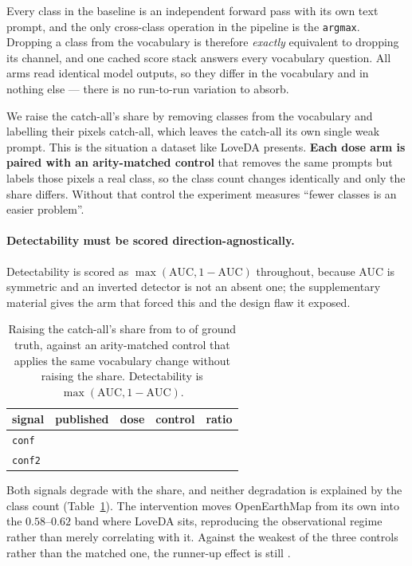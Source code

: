 \documentclass[10pt,a4paper]{article}                        %
\newcommand{\best}[1]{\textbf{#1}}
\newcommand{\suppref}[1]{the supplementary material}
\begin{document}
Every class in the baseline is an independent forward pass with its own text
prompt, and the only cross-class operation in the pipeline is the \texttt{argmax}.
Dropping a class from the vocabulary is therefore \emph{exactly} equivalent to
dropping its channel, and one cached score stack answers every vocabulary
question. All \ivArms{} arms read identical model outputs, so they differ in the
vocabulary and in nothing else --- there is no run-to-run variation to absorb.

We raise the catch-all's share by removing classes from the vocabulary and
labelling their pixels catch-all, which leaves the catch-all its own single weak
prompt. This is the situation a dataset like LoveDA presents. \best{Each dose arm
is paired with an arity-matched control} that removes the same prompts but labels
those pixels a real class, so the class count changes identically and only the
share differs. Without that control the experiment measures ``fewer classes is an
easier problem''.

\paragraph{Detectability must be scored direction-agnostically.} Detectability is scored as $\max(\mathrm{AUC}, 1-\mathrm{AUC})$ throughout, because AUC is symmetric and an inverted detector is not an absent one; \suppref{sup:auc} gives the arm that forced this and the design flaw it exposed.

\begin{table}[t]\centering\small
\caption{Raising the catch-all's share from \ivShareA{} to \ivShareD{} of ground
truth, against an arity-matched control that applies the same vocabulary change
without raising the share. Detectability is
$\max(\mathrm{AUC}, 1-\mathrm{AUC})$.}
\label{tab:intervention}
\begin{tabular}{lrrrr}
\toprule
signal & published & dose & control & ratio \\
\midrule
\texttt{conf}  & \ivA{}    & \best{\ivB{}}    & \ivD{}    & \ivRatio{} \\
\texttt{conf2} & \ivAtwo{} & \best{\ivBtwo{}} & \ivDtwo{} & \ivRatioTwo{} \\
\bottomrule
\end{tabular}
\end{table}

Both signals degrade with the share, and neither degradation is explained by the
class count (Table~\ref{tab:intervention}). The intervention moves OpenEarthMap
from its own \ivA{} into the $0.58$--$0.62$ band where LoveDA sits, reproducing
the observational regime rather than merely correlating with it. Against the
weakest of the three controls rather than the matched one, the runner-up effect
is still \ivRatioWorst{}.
\end{document}

